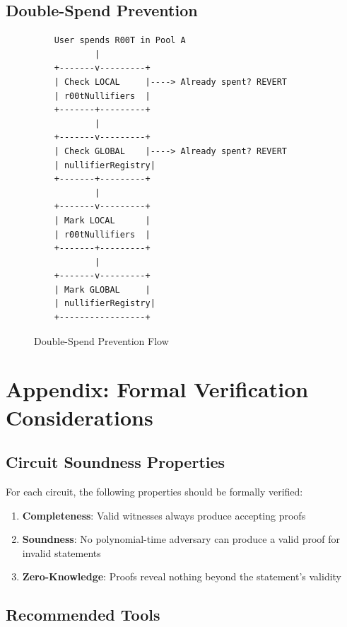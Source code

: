 \documentclass[11pt,a4paper]{article}
\begin{document}
\subsection{Double-Spend Prevention}

\begin{figure}[H]
\centering
\begin{verbatim}
    User spends R00T in Pool A
            |
    +-------v---------+
    | Check LOCAL     |----> Already spent? REVERT
    | r00tNullifiers  |
    +-------+---------+
            |
    +-------v---------+
    | Check GLOBAL    |----> Already spent? REVERT
    | nullifierRegistry|
    +-------+---------+
            |
    +-------v---------+
    | Mark LOCAL      |
    | r00tNullifiers  |
    +-------+---------+
            |
    +-------v---------+
    | Mark GLOBAL     |
    | nullifierRegistry|
    +-----------------+
\end{verbatim}
\caption{Double-Spend Prevention Flow}
\end{figure}

\section{Appendix: Formal Verification Considerations}

\subsection{Circuit Soundness Properties}

For each circuit, the following properties should be formally verified:

\begin{enumerate}
    \item \textbf{Completeness}: Valid witnesses always produce accepting proofs
    \item \textbf{Soundness}: No polynomial-time adversary can produce a valid proof for invalid statements
    \item \textbf{Zero-Knowledge}: Proofs reveal nothing beyond the statement's validity
\end{enumerate}

\subsection{Recommended Tools}
\end{document}
